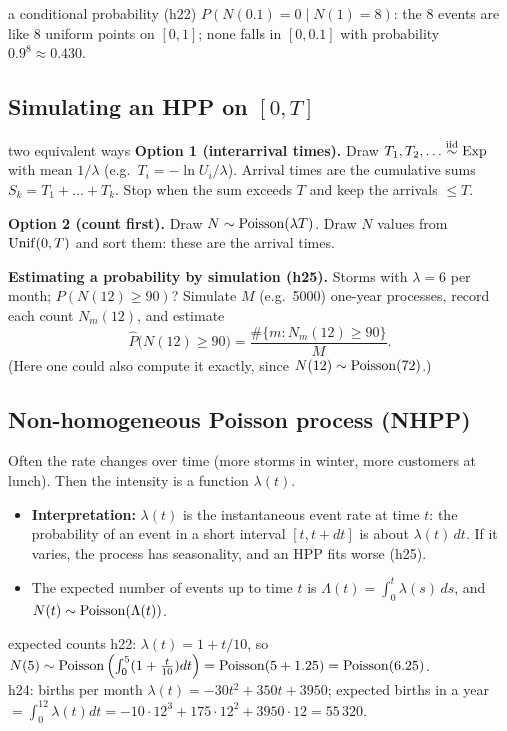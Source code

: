 \begin{example}{a conditional probability (h22)}
$P(N(0.1)=0\mid N(1)=8)$: the 8 events are like 8 uniform points on $[0,1]$; none falls in $[0,0.1]$ with probability $0.9^8\approx 0.430$.
\end{example}

\subsection{Simulating an HPP on $[0,T]$}
\begin{algo}{two equivalent ways}
\textbf{Option 1 (interarrival times).} Draw $T_1,T_2,\dots\overset{\text{iid}}{\sim}\mathrm{Exp}$ with mean $1/\lambda$ (e.g.\ $T_i = -\ln U_i/\lambda$). Arrival times are the cumulative sums $S_k = T_1+\dots+T_k$. Stop when the sum exceeds $T$ and keep the arrivals $\le T$.

\textbf{Option 2 (count first).} Draw $N\sim\mathrm{Poisson}(\lambda T)$. Draw $N$ values from $\mathrm{Unif}(0,T)$ and sort them: these are the arrival times.
\end{algo}

\textbf{Estimating a probability by simulation (h25).} Storms with $\lambda = 6$ per month; $P(N(12)\ge 90)$? Simulate $M$ (e.g.\ 5000) one-year processes, record each count $N_m(12)$, and estimate
\[
\widehat P\big(N(12)\ge 90\big) = \frac{\#\{m : N_m(12)\ge 90\}}{M}.
\]
(Here one could also compute it exactly, since $N(12)\sim\mathrm{Poisson}(72)$.)

\subsection{Non-homogeneous Poisson process (NHPP)}
Often the rate changes over time (more storms in winter, more customers at lunch). Then the intensity is a function $\lambda(t)$.
\begin{itemize}
  \item \textbf{Interpretation:} $\lambda(t)$ is the instantaneous event rate at time $t$: the probability of an event in a short interval $[t,t+dt]$ is about $\lambda(t)\,dt$. If it varies, the process has seasonality, and an HPP fits worse (h25).
  \item The expected number of events up to time $t$ is $\Lambda(t) = \int_0^t \lambda(s)\,ds$, and $N(t)\sim\mathrm{Poisson}(\Lambda(t))$.
\end{itemize}

\begin{example}{expected counts}
h22: $\lambda(t) = 1+t/10$, so $N(5)\sim\mathrm{Poisson}\left(\int_0^5 (1+\frac t{10})dt\right) = \mathrm{Poisson}(5+1.25) = \mathrm{Poisson}(6.25)$.\\
h24: births per month $\lambda(t) = -30t^2+350t+3950$; expected births in a year $=\int_0^{12}\lambda(t)dt = -10\cdot12^3+175\cdot12^2+3950\cdot12 = 55\,320$.
\end{example}


